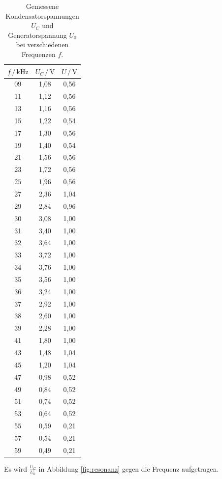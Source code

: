 \begin{table}
  \centering
  \caption{Gemessene Kondensatorspannungen $U_C$ und Generatorspannung $U_0$ bei verschiedenen Frequenzen $f$.}
  \label{tab:Messdaten2}
  \begin{tabular}{c c c}
  \toprule
  $f \,/\, \si{\kilo\hertz}$ & $U_C \,/\, \si{\volt}$ & $U \,/\, \si{\volt}$ \\
  \midrule
  09 & 1,08 & 0,56\\
  11 & 1,12 & 0,56\\
  13 & 1,16 & 0,56\\
  15 & 1,22 & 0,54\\
  17 & 1,30 & 0,56\\
  19 & 1,40 & 0,54\\
  21 & 1,56 & 0,56\\
  23 & 1,72 & 0,56\\
  25 & 1,96 & 0,56\\
  27 & 2,36 & 1,04\\
  29 & 2,84 & 0,96\\
  30 & 3,08 & 1,00\\
  31 & 3,40 & 1,00\\
  32 & 3,64 & 1,00\\
  33 & 3,72 & 1,00\\
  34 & 3,76 & 1,00\\
  35 & 3,56 & 1,00\\
  36 & 3,24 & 1,00\\
  37 & 2,92 & 1,00\\
  38 & 2,60 & 1,00\\
  39 & 2,28 & 1,00\\
  41 & 1,80 & 1,00\\
  43 & 1,48 & 1,04\\
  45 & 1,20 & 1,04\\
  47 & 0,98 & 0,52\\
  49 & 0,84 & 0,52\\
  51 & 0,74 & 0,52\\
  53 & 0,64 & 0,52\\
  55 & 0,59 & 0,21\\
  57 & 0,54 & 0,21\\
  59 & 0,49 & 0,21\\
  \bottomrule
  \end{tabular}
  \end{table} 

Es wird $\frac{U_C}{U_0}$ in Abbildung \ref{fig:resonanz} gegen die Frequenz aufgetragen. 

